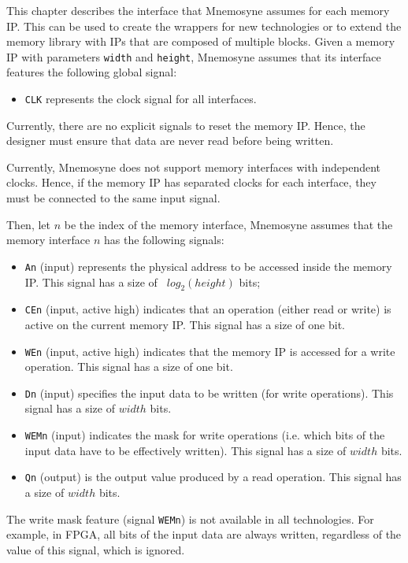 This chapter describes the interface that {\sc Mnemosyne} assumes for
each memory IP. This can be used to create the wrappers for new
technologies or to extend the memory library with IPs that are
composed of multiple blocks.
Given a memory IP with parameters {\tt width} and {\tt height}, {\sc
  Mnemosyne} assumes that its interface features the following global
signal:
\begin{itemize}
\item {\tt CLK} represents the clock signal for all interfaces.
\end{itemize}
\noindent Currently, there are no explicit signals to reset the memory IP. Hence, 
the designer must ensure that data are never read before being written.
\begin{lattention}
  Currently, {\sc Mnemosyne} does not support memory interfaces with
  independent clocks. Hence, if the memory IP has separated clocks for
  each interface, they must be connected to the same input signal.
\end{lattention}

\noindent Then, let $n$ be the index of the memory interface, {\sc
  Mnemosyne} assumes that the memory interface $n$ has the following
signals:
\begin{itemize}
\item {\tt An} (input) represents the physical address to be accessed
  inside the memory IP. This signal has a size of {\tt
    $log_2(height)$} bits;
\item {\tt CEn} (input, active high) indicates that an operation
  (either read or write) is active on the current memory IP. This
  signal has a size of one bit.
\item {\tt WEn} (input, active high) indicates that the memory IP is
  accessed for a write operation. This signal has a size of one bit.
\item {\tt Dn} (input) specifies the input data to be written (for
  write operations). This signal has a size of $width$ bits.
\item {\tt WEMn} (input) indicates the mask for write operations
  (i.e. which bits of the input data have to be effectively
  written). This signal has a size of $width$ bits.
\item {\tt Qn} (output) is the output value produced by a read
  operation. This signal has a size of $width$ bits.
\end{itemize}

\begin{lattention}
  The write mask feature (signal {\tt WEMn}) is not available in all
  technologies. For example, in FPGA, all bits of the input data are
  always written, regardless of the value of this signal, which is
  ignored.
\end{lattention}

